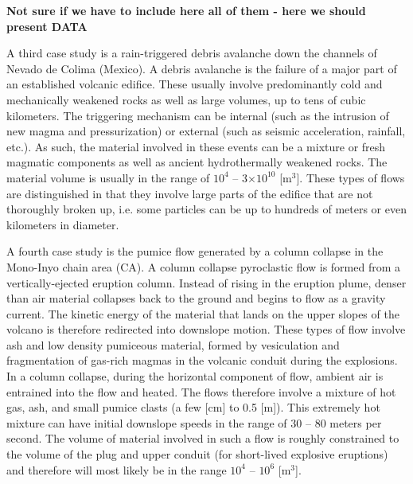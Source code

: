\textbf{Not sure if we have to include here all of them - here we should present DATA}

A third case study is a rain-triggered debris avalanche down the channels of Nevado de Colima (Mexico).
A debris avalanche is the failure of a major part of an established volcanic edifice. These usually involve predominantly cold and mechanically weakened rocks as well as large volumes, up to tens of cubic kilometers. The triggering mechanism can be internal (such as the intrusion of new magma and pressurization) or external (such as seismic acceleration, rainfall, etc.). As such, the material involved in these events can be a mixture or fresh magmatic components as well as ancient hydrothermally weakened rocks. The material volume is usually in the range of $10^4$ -- 3$\times10^{10}$ [$\mathrm{m^3}$]. These types of flows are distinguished in that they involve large parts of the edifice that are not thoroughly broken up, i.e. some particles can be up to hundreds of meters or even kilometers in diameter.

A fourth case study is the pumice flow generated by a column collapse in the Mono-Inyo chain area (CA).
A column collapse pyroclastic flow is formed from a vertically-ejected eruption column. Instead of rising in the eruption plume, denser than air material collapses back to the ground and begins to flow as a gravity current. The kinetic energy of the material that lands on the upper slopes of the volcano is therefore redirected into downslope motion. These types of flow involve ash and low density pumiceous material, formed by vesiculation and fragmentation of gas-rich magmas in the volcanic conduit during the explosions. In a column collapse, during the horizontal component of flow, ambient air is entrained into the flow and heated. The flows therefore involve a mixture of hot gas, ash, and small pumice clasts (a few [cm] to 0.5 [m]). This extremely hot mixture can have initial downslope speeds in the range of 30 -- 80 meters per second. The volume of material involved in such a flow is roughly constrained to the volume of the plug and upper conduit (for short-lived explosive eruptions) and therefore will most likely be in the range $10^4$ -- $10^6$ [$\mathrm{m^3}$]. 












